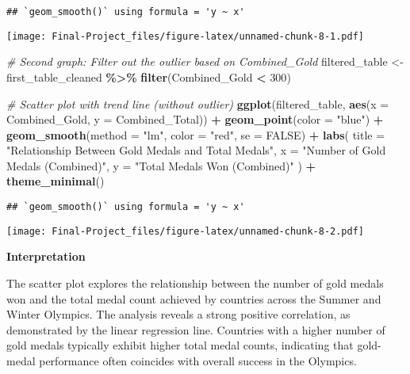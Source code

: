\documentclass[
]{article}
\newenvironment{Shaded}{\begin{snugshade}}{\end{snugshade}}
\newcommand{\AttributeTok}[1]{\textcolor[rgb]{0.13,0.29,0.53}{#1}}
\newcommand{\CommentTok}[1]{\textcolor[rgb]{0.56,0.35,0.01}{\textit{#1}}}
\newcommand{\ConstantTok}[1]{\textcolor[rgb]{0.56,0.35,0.01}{#1}}
\newcommand{\DecValTok}[1]{\textcolor[rgb]{0.00,0.00,0.81}{#1}}
\newcommand{\FunctionTok}[1]{\textcolor[rgb]{0.13,0.29,0.53}{\textbf{#1}}}
\newcommand{\NormalTok}[1]{#1}
\newcommand{\OtherTok}[1]{\textcolor[rgb]{0.56,0.35,0.01}{#1}}
\newcommand{\SpecialCharTok}[1]{\textcolor[rgb]{0.81,0.36,0.00}{\textbf{#1}}}
\newcommand{\StringTok}[1]{\textcolor[rgb]{0.31,0.60,0.02}{#1}}
\begin{document}
\begin{verbatim}
## `geom_smooth()` using formula = 'y ~ x'
\end{verbatim}

\texttt{[image: Final-Project\_files/figure-latex/unnamed-chunk-8-1.pdf]}

\begin{Shaded}
\begin{Highlighting}[]
\CommentTok{\# Second graph: Filter out the outlier based on Combined\_Gold}
\NormalTok{filtered\_table }\OtherTok{\textless{}{-}}\NormalTok{ first\_table\_cleaned }\SpecialCharTok{\%\textgreater{}\%}
  \FunctionTok{filter}\NormalTok{(Combined\_Gold }\SpecialCharTok{\textless{}} \DecValTok{300}\NormalTok{)  }

\CommentTok{\# Scatter plot with trend line (without outlier)}
\FunctionTok{ggplot}\NormalTok{(filtered\_table, }\FunctionTok{aes}\NormalTok{(}\AttributeTok{x =}\NormalTok{ Combined\_Gold, }\AttributeTok{y =}\NormalTok{ Combined\_Total)) }\SpecialCharTok{+}
  \FunctionTok{geom\_point}\NormalTok{(}\AttributeTok{color =} \StringTok{"blue"}\NormalTok{) }\SpecialCharTok{+} 
  \FunctionTok{geom\_smooth}\NormalTok{(}\AttributeTok{method =} \StringTok{"lm"}\NormalTok{, }\AttributeTok{color =} \StringTok{"red"}\NormalTok{, }\AttributeTok{se =} \ConstantTok{FALSE}\NormalTok{) }\SpecialCharTok{+} 
  \FunctionTok{labs}\NormalTok{(}
    \AttributeTok{title =} \StringTok{"Relationship Between Gold Medals and Total Medals"}\NormalTok{,}
    \AttributeTok{x =} \StringTok{"Number of Gold Medals (Combined)"}\NormalTok{,}
    \AttributeTok{y =} \StringTok{"Total Medals Won (Combined)"}
\NormalTok{  ) }\SpecialCharTok{+}
  \FunctionTok{theme\_minimal}\NormalTok{()}
\end{Highlighting}
\end{Shaded}

\begin{verbatim}
## `geom_smooth()` using formula = 'y ~ x'
\end{verbatim}

\texttt{[image: Final-Project\_files/figure-latex/unnamed-chunk-8-2.pdf]}

\textbf{Interpretation}

The scatter plot explores the relationship between the number of gold
medals won and the total medal count achieved by countries across the
Summer and Winter Olympics. The analysis reveals a strong positive
correlation, as demonstrated by the linear regression line. Countries
with a higher number of gold medals typically exhibit higher total medal
counts, indicating that gold-medal performance often coincides with
overall success in the Olympics.
\end{document}
